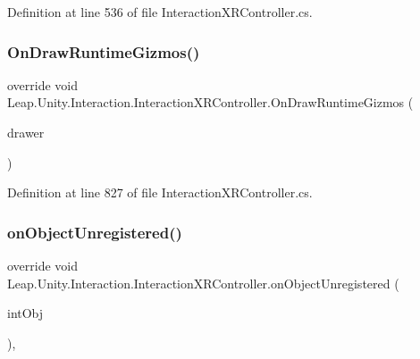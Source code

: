 Definition at line 536 of file Interaction\+X\+R\+Controller.\+cs.

\mbox{\label{class_leap_1_1_unity_1_1_interaction_1_1_interaction_x_r_controller_a3d2b1845b1041d41e2a157df230ca42b}} 
\subsubsection{\texorpdfstring{OnDrawRuntimeGizmos()}{OnDrawRuntimeGizmos()}}
{\footnotesize\ttfamily override void Leap.\+Unity.\+Interaction.\+Interaction\+X\+R\+Controller.\+On\+Draw\+Runtime\+Gizmos (\begin{DoxyParamCaption}\item[{\mbox{\hyperlink{class_leap_1_1_unity_1_1_runtime_gizmos_1_1_runtime_gizmo_drawer}{Runtime\+Gizmos.\+Runtime\+Gizmo\+Drawer}}}]{drawer }\end{DoxyParamCaption})}



Definition at line 827 of file Interaction\+X\+R\+Controller.\+cs.

\mbox{\label{class_leap_1_1_unity_1_1_interaction_1_1_interaction_x_r_controller_ab287ac4fbd0ba8471ef9787a371470ef}} 
\subsubsection{\texorpdfstring{onObjectUnregistered()}{onObjectUnregistered()}}
{\footnotesize\ttfamily override void Leap.\+Unity.\+Interaction.\+Interaction\+X\+R\+Controller.\+on\+Object\+Unregistered (\begin{DoxyParamCaption}\item[{\mbox{\hyperlink{interface_leap_1_1_unity_1_1_interaction_1_1_i_interaction_behaviour}{I\+Interaction\+Behaviour}}}]{int\+Obj }\end{DoxyParamCaption})\hspace{0.3cm}{\ttfamily [protected]}, {\ttfamily [virtual]}}



